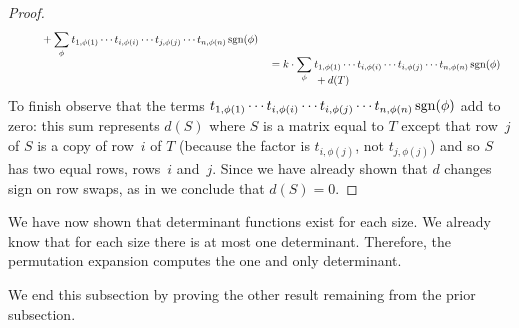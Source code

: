 \begin{proof}
\begin{align*}
\begin{aligned}[t]
         &\hbox{}\qquad\quad\hbox{}
            +\smash[b]{\sum_{\phi}}\:
            t_{1,\phi(1)}\cdots t_{i,\phi(i)}
            \cdots t_{j,\phi(j)}\cdots t_{n,\phi(n)}
                                 \sgn(\phi)        
     \end{aligned}                                               \\[1.25ex]
  &=\begin{aligned}[t]
       &k\cdot \smash[b]{\sum_{\smash{\phi}}}\:
            t_{1,\phi(1)}\cdots t_{i,\phi(i)}
            \cdots t_{i,\phi(j)}\cdots t_{n,\phi(n)}
                                 \sgn(\phi)          \\  %
       &\hbox{}\qquad\quad\hbox{}
             +d(T)          
     \end{aligned}
\end{align*}
To finish observe that the terms
\( t_{1,\phi(1)}\cdots t_{i,\phi(i)} \cdots t_{i,\phi(j)}\cdots t_{n,\phi(n)}
   \operatorname{sgn}(\phi)  \) add to zero:
this sum represents \( d(S) \) where \( S \) is a matrix equal to  \( T \)
except that row~$j$ of $S$ is a copy of row~$i$ of $T$ 
(because the factor is \( t_{i,\phi(j)} \), not \( t_{j,\phi(j)} \))
and so $S$ has two equal rows, rows~$i$ and~$j$.
Since we have already shown that $d$ changes sign on row swaps,
as in  we conclude that $d(S)=0$.
\end{proof}

We have now shown that determinant functions exist for each size.
We already know that for each size there is at most one
determinant.
Therefore, the permutation expansion
computes the one and only determinant.

We end this subsection by proving the other result 
remaining from the prior subsection.

